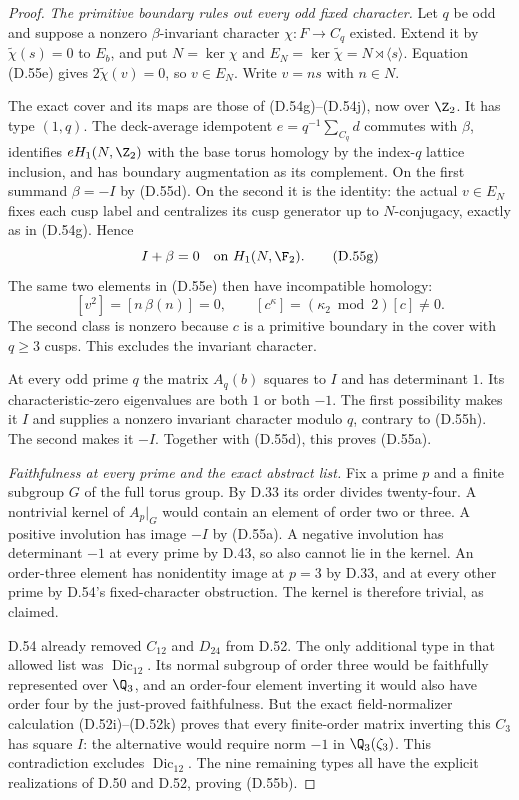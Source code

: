 \begin{proof}
\emph{The primitive boundary rules out every odd fixed character.}
Let $q$ be odd and suppose a nonzero
$\beta$-invariant character
$\chi:F\to C_q$ existed.
Extend it by $\widetilde\chi(s)=0$
to $E_b$, and put
$N=\ker\chi$ and
$E_N=\ker\widetilde\chi=N\rtimes\langle s\rangle$.
Equation (D.55e) gives
$2\widetilde\chi(v)=0$, so $v\in E_N$.
Write $v=ns$ with $n\in N$.

The exact cover and its maps are
those of (D.54g)--(D.54j), now over
$\Z_2$. It has type $(1,q)$.
The deck-average idempotent
$e=q^{-1}\sum_{C_q}d$ commutes
with $\beta$, identifies $eH_1(N,\Z_2)$
with the base torus homology by the
index-$q$ lattice inclusion, and
has boundary augmentation as its
complement.
On the first summand $\beta=-I$
by (D.55d). On the second it is
the identity: the actual $v\in E_N$
fixes each cusp label and centralizes
its cusp generator up to $N$-conjugacy,
exactly as in (D.54g).
Hence
\[
                  I+\beta=0
                       \quad\text{on }H_1(N,\F_2).
                                                               \tag{D.55g}
\]
The same two elements in (D.55e)
then have incompatible homology:
\[
             [v^2]=[n\,\beta(n)]=0,\qquad
             [c^\kappa]=(\kappa_2\bmod2)[c]\ne0.
                                                               \tag{D.55h}
\]
The second class is nonzero because
$c$ is a primitive boundary in
the cover with $q\geq3$ cusps.
This excludes the invariant character.

At every odd prime $q$ the matrix
$A_q(b)$ squares to $I$ and has
determinant $1$.
Its characteristic-zero eigenvalues
are both $1$ or both $-1$.
The first possibility makes it $I$
and supplies a nonzero invariant
character modulo $q$, contrary
to (D.55h).
The second makes it $-I$.
Together with (D.55d), this proves
(D.55a).

\emph{Faithfulness at every prime and the exact abstract list.}
Fix a prime $p$ and a finite
subgroup $G$ of the full torus group.
By D.33 its order divides twenty-four.
A nontrivial kernel of $A_p|_G$
would contain an element of order
two or three.
A positive involution has image
$-I$ by (D.55a).
A negative involution has determinant
$-1$ at every prime by D.43, so
also cannot lie in the kernel.
An order-three element has nonidentity
image at $p=3$ by D.33, and at
every other prime by D.54's
fixed-character obstruction.
The kernel is therefore trivial,
as claimed.

D.54 already removed $C_{12}$
and $D_{24}$ from D.52.
The only additional type in that
allowed list was $\operatorname{Dic}_{12}$.
Its normal subgroup of order three
would be faithfully represented over
$\Q_3$, and an order-four element
inverting it would also have order
four by the just-proved faithfulness.
But the exact field-normalizer
calculation (D.52i)--(D.52k) proves
that every finite-order matrix
inverting this $C_3$ has square $I$:
the alternative would require norm
$-1$ in $\Q_3(\zeta_3)$.
This contradiction excludes
$\operatorname{Dic}_{12}$.
The nine remaining types all have
the explicit realizations of
D.50 and D.52, proving (D.55b).


\end{proof}
